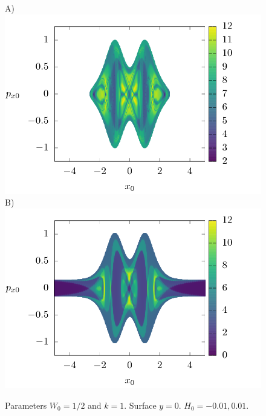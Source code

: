 \documentclass[10pt,aps,onecolumn,superscriptaddress]{revtex4-2}
\begin{document}
\begin{figure}[htbp]
	A)\includegraphics[scale=0.35]{ld_xpx_t20_E-001.png}
	B)\includegraphics[scale=0.35]{ld_xpx_t20_E001.png}	
	\caption{Parameters $W_0 = 1/2$ and $k = 1$. Surface $y = 0$. $H_0 =-0.01, 0.01$.  }
	\label{fig:ld_x_px}
\end{figure}
\end{document}
